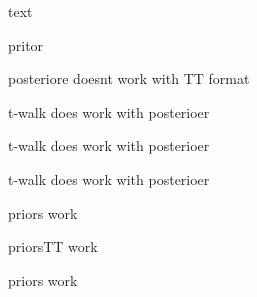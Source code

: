 \begin{figure}[t!]
	\centering
	\begin{subfigure}[]{.49\columnwidth}
		\centering
		\scalebox{0.42}{}
		\caption{}
	\end{subfigure}%
	\begin{subfigure}[]{.49\columnwidth}
		\centering
		\scalebox{0.42}{}
		\caption{}
	\end{subfigure}
	\caption{}
\end{figure}

\begin{figure}[h]
	\centering
	\scalebox{0.66}{}
	\caption[]{text}
	\label{fig:Results}
\end{figure}



\begin{figure}[h]
	\centering
	\scalebox{0.66}{}
	\caption[]{pritor}
	\label{fig:Results}
\end{figure}

\begin{figure}[h]
	\centering
	\scalebox{0.66}{}
	\caption[]{posteriore doesnt work with TT format}
	\label{fig:Results}
\end{figure}


\begin{figure}[h]
	\centering
	\scalebox{0.66}{}
	\caption[]{t-walk does work with posterioer}
	\label{fig:Results}
\end{figure}

\begin{figure}[h]
	\centering
	\scalebox{0.33}{}
	\caption[]{t-walk does work with posterioer}
	\label{fig:Results}
\end{figure}
\begin{figure}[h]
	\centering
	\scalebox{0.33}{}
	\caption[]{t-walk does work with posterioer}
	\label{fig:Results}
\end{figure}




\begin{figure}[h]
	\centering
	\scalebox{1}{}
	\caption[]{priors work}
	\label{fig:Results}
\end{figure}


\begin{figure}[h]
	\centering
	\scalebox{1}{}
	\caption[]{priorsTT work}
	\label{fig:Results}
\end{figure}


\begin{figure}[h]
	\centering
	\scalebox{1}{}
	\caption[]{priors work}
	\label{fig:Results}
\end{figure}


